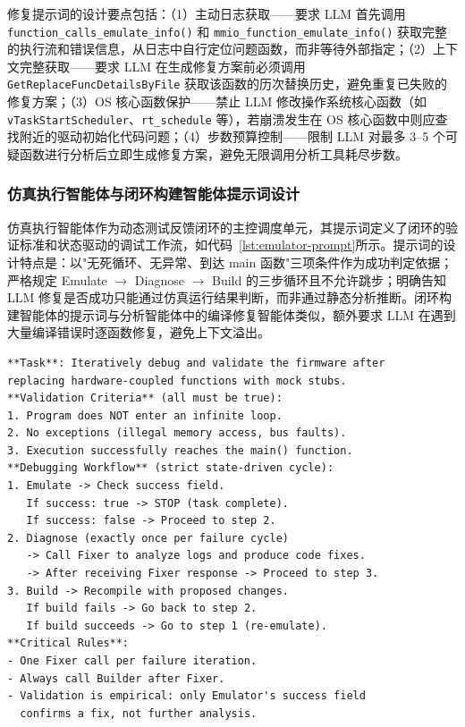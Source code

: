 修复提示词的设计要点包括：（1）主动日志获取——要求 LLM 首先调用 \texttt{function\_calls\_emulate\_info()} 和 \texttt{mmio\_function\_emulate\_info()} 获取完整的执行流和错误信息，从日志中自行定位问题函数，而非等待外部指定；（2）上下文完整获取——要求 LLM 在生成修复方案前必须调用 \texttt{GetReplaceFuncDetailsByFile} 获取该函数的历次替换历史，避免重复已失败的修复方案；（3）OS 核心函数保护——禁止 LLM 修改操作系统核心函数（如 \texttt{vTaskStartScheduler}、\texttt{rt\_schedule} 等），若崩溃发生在 OS 核心函数中则应查找附近的驱动初始化代码问题；（4）步数预算控制——限制 LLM 对最多 3--5 个可疑函数进行分析后立即生成修复方案，避免无限调用分析工具耗尽步数。

\subsubsection{仿真执行智能体与闭环构建智能体提示词设计}

仿真执行智能体作为动态测试反馈闭环的主控调度单元，其提示词定义了闭环的验证标准和状态驱动的调试工作流，如代码~\ref{lst:emulator-prompt}所示。提示词的设计特点是：以"无死循环、无异常、到达 main 函数"三项条件作为成功判定依据；严格规定 Emulate $\to$ Diagnose $\to$ Build 的三步循环且不允许跳步；明确告知 LLM 修复是否成功只能通过仿真运行结果判断，而非通过静态分析推断。闭环构建智能体的提示词与分析智能体中的编译修复智能体类似，额外要求 LLM 在遇到大量编译错误时逐函数修复，避免上下文溢出。

{\renewcommand{\lstlistingname}{代码清单}\begin{lstlisting}[style=PromptStyle,caption={仿真执行智能体提示词骨架},label=lst:emulator-prompt]
**Task**: Iteratively debug and validate the firmware after
replacing hardware-coupled functions with mock stubs.
**Validation Criteria** (all must be true):
1. Program does NOT enter an infinite loop.
2. No exceptions (illegal memory access, bus faults).
3. Execution successfully reaches the main() function.
**Debugging Workflow** (strict state-driven cycle):
1. Emulate -> Check success field.
   If success: true -> STOP (task complete).
   If success: false -> Proceed to step 2.
2. Diagnose (exactly once per failure cycle)
   -> Call Fixer to analyze logs and produce code fixes.
   -> After receiving Fixer response -> Proceed to step 3.
3. Build -> Recompile with proposed changes.
   If build fails -> Go back to step 2.
   If build succeeds -> Go to step 1 (re-emulate).
**Critical Rules**:
- One Fixer call per failure iteration.
- Always call Builder after Fixer.
- Validation is empirical: only Emulator's success field
  confirms a fix, not further analysis.
\end{lstlisting}}

